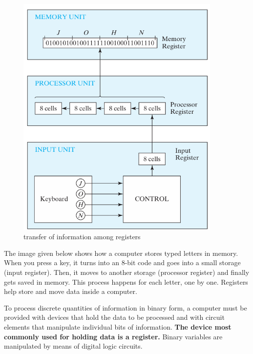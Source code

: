\documentclass[a4paper,12pt]{article}
\begin{document}
\begin{figure}
\centering
    \includegraphics[width=0.9\textwidth]{figs/figure1.png}
    \caption{transfer of information among registers}
    \label{fig:enter-label}
\end{figure}

The image given below shows how a computer stores typed letters in memory. When you press a key, it turns into an 8-bit code and goes into a small storage (input register). Then, it moves to another storage (processor register) and finally gets saved in memory. This process happens for each letter, one by one. Registers help store and move data inside a computer.

\newpage
To process discrete quantities of information in binary form, a computer must be 
provided with devices that hold the data to be processed and with circuit elements that 
manipulate individual bits of information.\textbf{ The device most commonly used for holding 
data is a register.}
Binary variables are manipulated by means of digital logic circuits.
\end{document}
